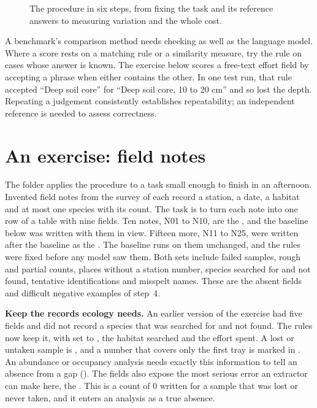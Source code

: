 \begin{figure}[htbp]
\centering
{}
\caption{The procedure in six steps, from fixing the task and its reference
answers to measuring variation and the whole cost.}
\label{fig:procedure}
\end{figure}

A benchmark's comparison method needs checking as well as the language model.
Where a score rests on a matching rule or a similarity measure, try the rule on
cases whose answer is known. The exercise below scores a free-text effort field
by accepting a phrase when either contains the other. In one test run, that
rule accepted ``Deep soil core'' for ``Deep soil core, 10 to 20 cm'' and so
lost the depth. Repeating a judgement consistently establishes repeatability;
an independent reference is needed to assess correctness.

\section{An exercise: field notes}

The  folder applies the procedure to a task small
enough to finish in an afternoon. Invented field notes from the survey of
 each record a station, a date, a habitat and at most one
species with its count. The task is to turn each note into one row of a table
with nine fields. Ten notes, N01 to N10, are the , and
the baseline below was written with them in view. Fifteen more, N11 to N25, were
written after the baseline as the . The baseline runs on
them unchanged, and the rules were fixed before any model saw them. Both sets
include failed samples, rough and partial counts, places without a station
number, species searched for and not found, tentative identifications and
misspelt names. These are the absent fields and difficult negative examples of
step~4.

\textbf{Keep the records ecology needs.} An earlier version of the exercise had
five fields and did not record a species that was searched for and not found.
The rules now keep it, with  set to , the habitat
searched and the effort spent. A lost or untaken sample is ,
and a number that covers only the first tray is marked  in
. An abundance or occupancy analysis needs exactly this
information to tell an absence from a gap (). The fields
also expose the most serious error an extractor can make here, the
. This is a count of 0 written for a sample that was lost or
never taken, and it enters an analysis as a true absence.

